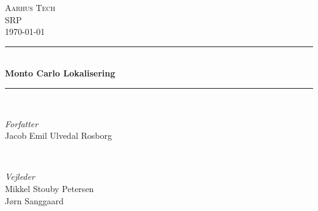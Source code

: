 \documentclass[../SRP.tex]{subfiles}
\begin{document}
\begin{titlepage}
  \newcommand{\HRule}{\rule{\linewidth}{0.5mm}}

	\center

	\textsc{\LARGE Aarhus Tech} \\[0.25cm]
  \textsc{\Large SRP} \\[0.5cm]



  {\large\today}
  \\[1cm]

	\HRule\\[0.4cm]
	{\huge\bfseries Monto Carlo Lokalisering}\\[0.1cm]

	\HRule\\[1.5cm]

	\begin{minipage}{0.4\textwidth}
		\begin{flushleft}
			\large
			\textit{Forfatter}\\
			Jacob Emil Ulvedal Rosborg %
		\end{flushleft}
	\end{minipage}
	~
	\begin{minipage}{0.4\textwidth}
		\begin{flushright}
			\large
			\textit{Vejleder}\\
			Mikkel Stouby Petersen\\
			Jørn Sanggaard
		\end{flushright}
	\end{minipage}\\[4.0cm]

  \begin{center}
  \begin{minipage}{0.8\textwidth}
    \\
    \justify
    \lipsum[1]
  \end{minipage}
  \end{center}
\end{titlepage}
\end{document}
